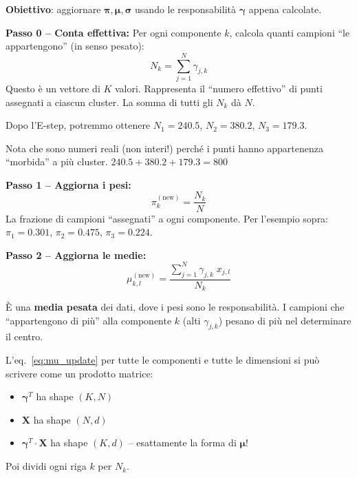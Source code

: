 \documentclass[11pt,a4paper]{article}
\begin{document}
\textbf{Obiettivo}: aggiornare $\boldsymbol{\pi}, \boldsymbol{\mu}, \boldsymbol{\sigma}$ usando le responsabilit\`a $\boldsymbol{\gamma}$ appena calcolate.

\medskip
\textbf{Passo 0 -- Conta effettiva:} Per ogni componente $k$, calcola quanti campioni ``le appartengono'' (in senso pesato):
\begin{equation}
    N_k = \sum_{j=1}^{N} \gamma_{j,k}
\end{equation}
Questo \`e un vettore di $K$ valori. Rappresenta il ``numero effettivo'' di punti assegnati a ciascun cluster. La somma di tutti gli $N_k$ d\`a $N$.

\begin{exbox}[Esempio con $K=3$, $N=800$]
Dopo l'E-step, potremmo ottenere $N_1 = 240.5$, $N_2 = 380.2$, $N_3 = 179.3$.

Nota che sono numeri reali (non interi!) perch\'e i punti hanno appartenenza ``morbida'' a pi\`u cluster. $240.5 + 380.2 + 179.3 = 800$ {\color{green!50!black}\checkmark}
\end{exbox}

\bigskip
\textbf{Passo 1 -- Aggiorna i pesi:}
\begin{equation}
    \boxed{\pi_k^{(\text{new})} = \frac{N_k}{N}}
\end{equation}
La frazione di campioni ``assegnati'' a ogni componente. Per l'esempio sopra: $\pi_1 = 0.301$, $\pi_2 = 0.475$, $\pi_3 = 0.224$.

\bigskip
\textbf{Passo 2 -- Aggiorna le medie:}
\begin{equation}
    \boxed{\mu_{k,l}^{(\text{new})} = \frac{\displaystyle\sum_{j=1}^{N} \gamma_{j,k}\; x_{j,l}}{N_k}}
    \label{eq:mu_update}
\end{equation}

\`E una \textbf{media pesata} dei dati, dove i pesi sono le responsabilit\`a. I campioni che ``appartengono di pi\`u'' alla componente $k$ (alti $\gamma_{j,k}$) pesano di pi\`u nel determinare il centro.

\begin{tipbox}
L'eq.~\eqref{eq:mu_update} per tutte le componenti e tutte le dimensioni si pu\`o scrivere come un prodotto matrice:
\begin{itemize}
    \item $\boldsymbol{\gamma}^T$ ha shape $(K, N)$
    \item $\mathbf{X}$ ha shape $(N, d)$
    \item $\boldsymbol{\gamma}^T \cdot \mathbf{X}$ ha shape $(K, d)$ -- esattamente la forma di $\boldsymbol{\mu}$!
\end{itemize}
Poi dividi ogni riga $k$ per $N_k$.
\end{tipbox}
\end{document}
